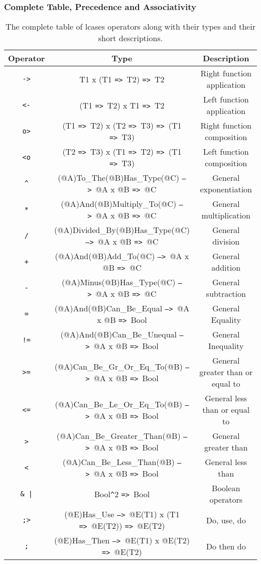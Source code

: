 \documentclass{article}
\def\ra{\texttt{=>}\ }
\def\Ra{\texttt{-->}\ }
\begin{document}
\newpage
\subsubsection{Complete Table, Precedence and Associativity}

\begin{table}[h]

\caption{
The complete table of lcases operators along with their types and 
their short descriptions.
}

\begin{center}
\begin{tabular}{ |c|c|c| } 
\hline
Operator & Type & Description \\ 
\hline
\hline
\texttt{->} & T1 x (T1 \ra T2) \ra T2 & Right function application \\
\hline
\texttt{<-} & (T1 \ra T2) x T1 \ra T2 & Left function application \\
\hline
\texttt{o>} & (T1 \ra T2) x (T2 \ra T3) \ra (T1 \ra T3) & Right function composition
\\
\hline
\texttt{<o} & (T2 \ra T3) x (T1 \ra T2) \ra (T1 \ra T3) & Left function composition
\\
\hline
\texttt{\^} & (@A)To_The(@B)Has_Type(@C) \Ra @A x @B \ra @C & General exponentiation
\\
\hline
\texttt{*} & (@A)And(@B)Multiply_To(@C) \Ra @A x @B \ra @C & General multiplication
\\
\hline
\texttt{/} & (@A)Divided_By(@B)Has_Type(@C) \Ra @A x @B \ra @C & General division \\
\hline
\texttt{+} & (@A)And(@B)Add_To(@C) \Ra @A x @B \ra @C & General addition \\ 
\hline
\texttt{-} & (@A)Minus(@B)Has_Type(@C) \Ra @A x @B \ra @C & General subtraction \\
\hline
\texttt{=} & (@A)And(@B)Can_Be_Equal \Ra @A x @B \ra Bool & General Equality \\
\hline
\texttt{!=} & (@A)And(@B)Can_Be_Unequal \Ra @A x @B \ra Bool & General Inequality \\
\hline
\texttt{>=} & (@A)Can_Be_Gr_Or_Eq_To(@B) \Ra @A x @B \ra Bool
& General greater than or equal to \\
\hline
\texttt{<=} & (@A)Can_Be_Le_Or_Eq_To(@B) \Ra @A x @B \ra Bool
& General less than or equal to \\
\hline
\texttt{>} & (@A)Can_Be_Greater_Than(@B) \Ra @A x @B \ra Bool & General greater than \\
\hline
\texttt{<} & (@A)Can_Be_Less_Than(@B) \Ra @A x @B \ra Bool & General less than \\
\hline
\texttt{\& |} & Bool\texttt{\^}2 \ra Bool & Boolean operators \\
\hline
\texttt{;>} & (@E)Has_Use \Ra @E(T1) x (T1 \ra @E(T2)) \ra @E(T2) &
Do, use, do \\
\hline
\texttt{;} & (@E)Has_Then \Ra @E(T1) x @E(T2) \ra @E(T2) &
Do then do \\
\hline
\end{tabular}
\end{center}

\label{table:allops}

\end{table}
\end{document}
